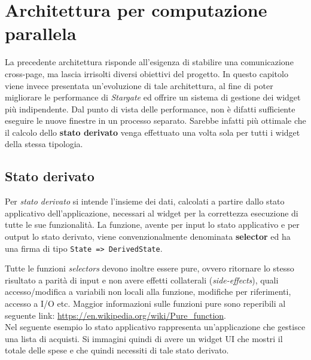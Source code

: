 
\chapter{Architettura per computazione parallela}
\label{cap:progettazione-codifica}

La precedente architettura risponde all'esigenza di stabilire una comunicazione cross-page, ma lascia irrisolti diversi obiettivi del progetto. In questo capitolo viene invece presentata un'evoluzione di tale architettura, al fine di poter migliorare le performance di \textit{Stargate} ed offrire un sistema di gestione dei widget più indipendente.
Dal punto di vista delle performance, non è difatti sufficiente eseguire le nuove finestre in un processo separato. Sarebbe infatti più ottimale che il calcolo dello \textbf{stato derivato} venga effettuato una volta sola per tutti i widget della stessa tipologia.

\section{Stato derivato}

Per \textit{stato derivato} si intende l'insieme dei dati, calcolati a partire dallo stato applicativo dell'applicazione, necessari al widget per la correttezza esecuzione di tutte le sue funzionalità. La funzione, avente per input lo stato applicativo e per output lo stato derivato, viene convenzionalmente denominata \textbf{selector} ed ha una firma di tipo \texttt{State => DerivedState}.

Tutte le funzioni \textit{selectors} devono inoltre essere pure, ovvero ritornare lo stesso risultato a parità di input e non avere effetti collaterali (\textit{side-effects}), quali accesso/modifica a variabili non locali alla funzione, modifiche per riferimenti, accesso a I/O etc. Maggior informazioni sulle funzioni pure sono reperibili al seguente link: \url{https://en.wikipedia.org/wiki/Pure_function}. \\

Nel seguente esempio lo stato applicativo rappresenta un'applicazione che gestisce una lista di acquisti. Si immagini quindi di avere un widget UI che mostri il totale delle spese e che quindi necessiti di tale stato derivato.

